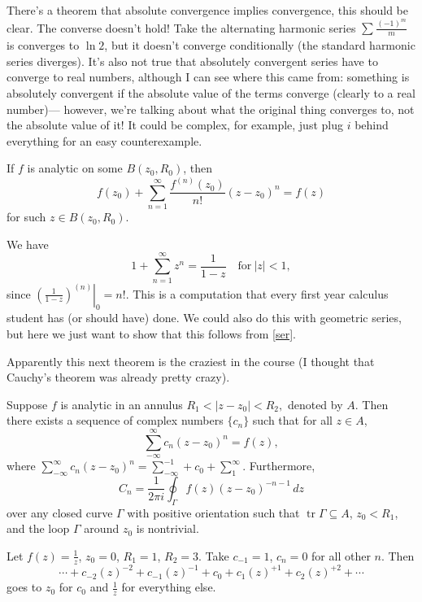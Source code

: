 There's a theorem that absolute convergence implies convergence, this should be clear. The converse doesn't hold! Take the alternating harmonic series $\sum_{}^{} \frac{(-1)^m}{m}$ is converges to $\ln 2$, but it doesn't converge conditionally (the standard harmonic series diverges). It's also not true that absolutely convergent series have to converge to real numbers, although I can see where this came from: something is absolutely convergent if the absolute value of the terms converge (clearly to a real number)— however, we're talking about what the original thing converges to, not the absolute value of it! It could be complex, for example, just plug $i$ behind everything for an easy counterexample.
\begin{theorem}\label{ser}
    If $f$ is analytic on some $B(z_0,R_0)$, then \[
        f(z_0)+ \sum_{n=1}^{\infty} \frac{f^{(n)}(z_0)}{n!}(z-z_0)^{n}=f(z)
    \] for such $z\in B(z_0,R_0).$
\end{theorem}
\begin{example}
    We have \[
        1+\sum_{n=1}^{\infty} z^n =\frac{1}{1-z}\quad \text{for} \ |z|<1,
    \] since $\left. \left( \frac{1}{1-z} \right) ^{(n)} \right|_0=n! $. This is a computation that every first year calculus student has (or should have) done. We could also do this with geometric series, but here we just want to show that this follows from \cref{ser}.
\end{example}

Apparently this next theorem is the craziest in the course (I thought that Cauchy's theorem was already pretty crazy).
\begin{theorem}
Suppose $f$ is analytic in an annulus $R_1<|z-z_0|<R_2,$ denoted by $A$. Then there exists a sequence of complex numbers $\{c_n \} $ such that for all $z\in A$, \[
    \sum_{-\infty}^{\infty} c_n (z-z_0)^n =f(z),
\] where $\sum_{-\infty}^{\infty} c_n (z-z_0)^n=\sum_{-\infty}^{-1} +c_0+\sum_{1}^{\infty} .$ Furthermore, \[
C_n =\frac{1}{2\pi i}\oint_{\Gamma }^{} f(z)(z-z_0)^{-n-1} \, dz
\] over any closed curve $\Gamma $ with positive orientation such that $\operatorname{tr}\Gamma \subseteq A$, $z_0<R_1$, and the loop $\Gamma $ around $z_0$ is nontrivial.
\end{theorem}
\begin{example}
    Let $f(z)=\frac{1}{z}$, $z_0=0$, $R_1=1$, $R_2=3$. Take $c_{-1}=1$, $c_n =0$ for all other $n$. Then \[
        \cdots +c_{-2}(z)^{-2}+c_{-1}(z)^{-1}+c_0+c_1(z)^{+1}+c_2(z)^{+2}+\cdots 
    \] goes to $z_0$ for $c_0$ and $\frac{1}{z}$ for everything else.
\end{example}


